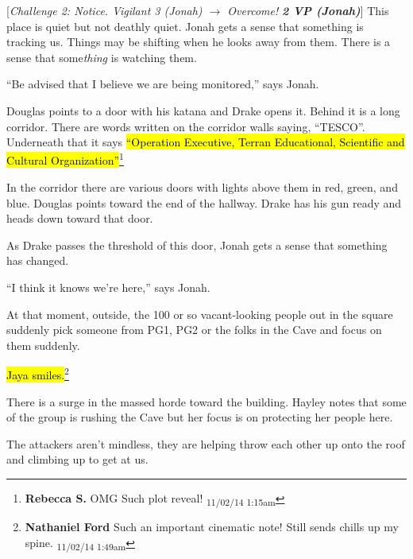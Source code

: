 {[}\textit{Challenge 2: Notice.  Vigilant 3 (Jonah) $\rightarrow$ Overcome! }\textit{\textbf{2 VP (Jonah)}}{]}  This place is quiet but not deathly quiet.  Jonah gets a sense that something is tracking us.  Things may be shifting when he looks away from them.  There is a sense that some\textit{thing} is watching them.

``Be advised that I believe we are being monitored,'' says Jonah.

Douglas points to a door with his katana and Drake opens it.  Behind it is a long corridor.  There are words written on the corridor walls saying, ``TESCO''.  Underneath that it says \hl{``Operation Executive, Terran Educational, Scientific and Cultural Organization''}\footnote{\textbf{Rebecca S. }OMG
Such plot reveal! \textsubscript{11/02/14 1:15am}}

In the corridor there are various doors with lights above them in red, green, and blue. Douglas points toward the end of the hallway.  Drake has his gun ready and heads down toward that door.

As Drake passes the threshold of this door, Jonah gets a sense that something has changed.

``I think it knows we're here,'' says Jonah.





At that moment, outside, the 100 or so vacant-looking people out in the square suddenly pick someone from PG1, PG2 or the folks in the Cave and focus on them suddenly.



\hl{Jaya smiles.}\footnote{\textbf{Nathaniel Ford }Such an important cinematic note! Still sends chills up my spine. \textsubscript{11/02/14 1:49am}}



There is a surge in the massed horde toward the building.  Hayley notes that some of the group is rushing the Cave but her focus is on protecting her people here.

The attackers aren't mindless, they are helping throw each other up onto the roof and climbing up to get at us.

